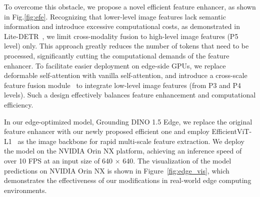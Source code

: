 To overcome this obstacle, we propose a novel efficient feature enhancer, as shown in Fig.\ref{fig:efe}.
Recognizing that lower-level image features lack semantic information and introduce excessive computational costs, as demonstrated in Lite-DETR~\cite{LiteDETR}, we limit cross-modality fusion to high-level image features (P5 level) only. This approach greatly reduces the number of tokens that need to be processed, significantly cutting the computational demands of the feature enhancer. To facilitate easier deployment on edge-side GPUs, we replace deformable self-attention with vanilla self-attention, and introduce a cross-scale feature fusion module~\cite{zhao2023detrs} to integrate low-level image features (from P3 and P4 levels). Such a design effectively balances feature enhancement and computational efficiency.

In our edge-optimized model, Grounding DINO 1.5 Edge, we replace the original feature enhancer with our newly proposed efficient one and employ EfficientViT-L1~\cite{Cai_2023_ICCV} as the image backbone for rapid multi-scale feature extraction. We deploy the model on the NVIDIA Orin NX platform, achieving an inference speed of over 10 FPS at an input size of 640 $\times$ 640. The visualization of the model predictions on NVIDIA Orin NX is shown in Figure~\ref{fig:edge_vis}, which demonstrates the effectiveness of our modifications in real-world edge computing environments.

